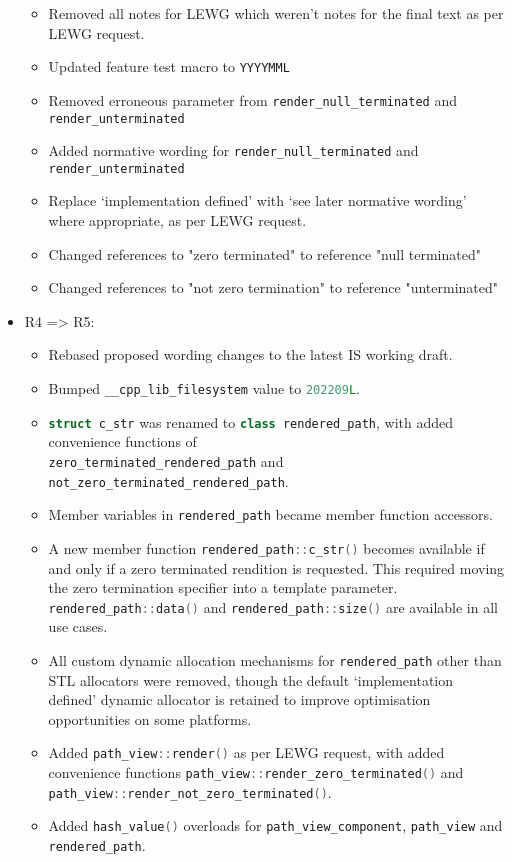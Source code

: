 \documentclass[11pt]{article}
\newcommand{\code}[2][cpp]{\lstinline[language=#1,basicstyle=\small\ttfamily]{#2}}
\begin{document}
\begin{itemize}
\begin{itemize}
    \item Removed all notes for LEWG which weren't notes for the final text as per LEWG request.
    \item Updated feature test macro to \code{YYYYMML}
    \item Removed erroneous parameter from \code{render_null_terminated} and \code{render_unterminated}
    \item Added normative wording for \code{render_null_terminated} and \code{render_unterminated}
    \item Replace `implementation defined' with `see later normative wording' where appropriate,
    as per LEWG request.
    \item Changed references to "zero terminated" to reference "null terminated"
    \item Changed references to "not zero termination" to reference "unterminated"
    \end{itemize}

    \item R4 => R5:
    \begin{itemize}
        \item Rebased proposed wording changes to the latest IS working draft.
        \item Bumped \code{__cpp_lib_filesystem} value to \code{202209L}.
        \item \code{struct c_str} was renamed to \code{class rendered_path}, with added convenience functions of \\
        \code{zero_terminated_rendered_path} and \code{not_zero_terminated_rendered_path}.
        \item Member variables in \code{rendered_path} became member function accessors.
        \item A new member function \code{rendered_path::c_str()} becomes available if and only if a zero terminated rendition is requested. This required moving the zero termination specifier into a template parameter. \code{rendered_path::data()} and \code{rendered_path::size()} are available in all use cases.
        \item All custom dynamic allocation mechanisms for \code{rendered_path} other than STL allocators were removed, though the default `implementation defined' dynamic allocator is retained to improve optimisation opportunities on some platforms.
        \item Added \code{path_view::render()} as per LEWG request, with added convenience functions \code{path_view::render_zero_terminated()} and \code{path_view::render_not_zero_terminated()}.
        \item Added \code{hash_value()} overloads for \code{path_view_component}, \code{path_view} and \code{rendered_path}.
    \end{itemize}
\end{itemize}
\end{document}
